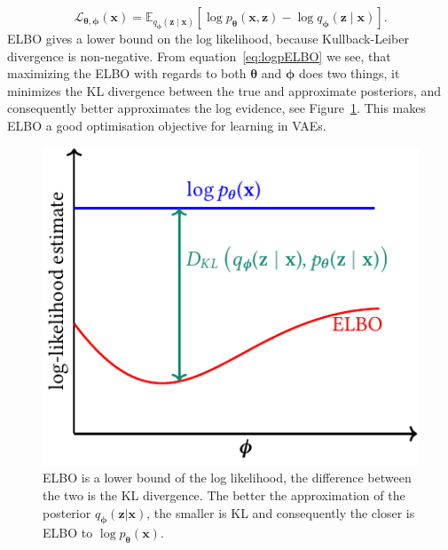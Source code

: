 \documentclass[final,3p,times,twocolumn]{elsarticle}
\begin{document}
\begin{equation}
	\mathcal{L}_{\boldsymbol{\theta}, \boldsymbol{\phi}}(\mathbf{x}) = \mathbb{E}_{q_{\boldsymbol{\phi}}(\mathbf{z} \mid \mathbf{x})}\left[\log p_{\boldsymbol{\theta}}(\mathbf{x}, \mathbf{z})-\log q_{\boldsymbol{\phi}}(\mathbf{z} \mid \mathbf{x})\right]. 
\end{equation}
ELBO gives a lower bound on the log likelihood, because Kullback-Leiber divergence is non-negative. From equation~\eqref{eq:logpELBO} we see, that maximizing the ELBO with regards to both $\boldsymbol{\theta}$ and $\boldsymbol{\phi}$ does two things, it minimizes the KL divergence between the true and approximate posteriors, and consequently better approximates the log evidence, see Figure~\ref{fig:elbodiagram}. This makes ELBO a good optimisation objective for learning in VAEs. 
\begin{figure}
	\centering
	\includegraphics[width=0.8\linewidth]{../diagrams/elbo/elbo_diagram}
	\caption{ELBO is a lower bound of the log likelihood, the difference between the two is the KL divergence. The better the approximation of the posterior $q_{\boldsymbol{\phi}}(\mathbf{z}|\mathbf{x})$, the smaller is KL and consequently the closer is ELBO to $\log p_{\boldsymbol{\theta}}(\mathbf{x})$.}
	\label{fig:elbodiagram}
\end{figure}
\end{document}
